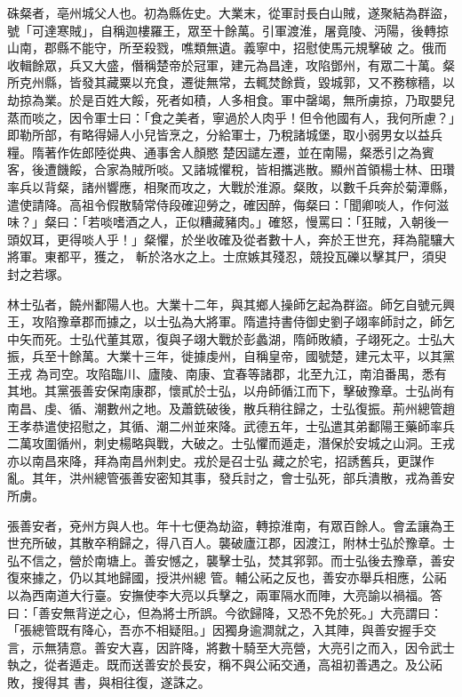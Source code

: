 \begin{pinyinscope}
 硃粲者，亳州城父人也。初為縣佐史。大業末，從軍討長白山賊，遂聚結為群盜，號「可達寒賊」，自稱迦樓羅王，眾至十餘萬。引軍渡淮，屠竟陵、沔陽，後轉掠山南，郡縣不能守，所至殺戮，噍類無遺。義寧中，招慰使馬元規擊破
 之。俄而收輯餘眾，兵又大盛，僭稱楚帝於冠軍，建元為昌達，攻陷鄧州，有眾二十萬。粲所克州縣，皆發其藏粟以充食，遷徙無常，去輒焚餘貲，毀城郭，又不務稼穡，以劫掠為業。於是百姓大餒，死者如積，人多相食。軍中罄竭，無所虜掠，乃取嬰兒蒸而啖之，因令軍士曰：「食之美者，寧過於人肉乎！但令他國有人，我何所慮？」即勒所部，有略得婦人小兒皆烹之，分給軍士，乃稅諸城堡，取小弱男女以益兵糧。隋著作佐郎陸從典、通事舍人顏愍
 楚因譴左遷，並在南陽，粲悉引之為賓客，後遭饑餒，合家為賊所啖。又諸城懼稅，皆相攜逃散。顯州首領楊士林、田瓚率兵以背粲，諸州響應，相聚而攻之，大戰於淮源。粲敗，以數千兵奔於菊潭縣，遣使請降。高祖令假散騎常侍段確迎勞之，確因醉，侮粲曰：「聞卿啖人，作何滋味？」粲曰：「若啖嗜酒之人，正似糟藏豬肉。」確怒，慢罵曰：「狂賊，入朝後一頭奴耳，更得啖人乎！」粲懼，於坐收確及從者數十人，奔於王世充，拜為龍驤大將軍。東都平，獲之，
 斬於洛水之上。士庶嫉其殘忍，競投瓦礫以擊其尸，須臾封之若塚。



 林士弘者，饒州鄱陽人也。大業十二年，與其鄉人操師乞起為群盜。師乞自號元興王，攻陷豫章郡而據之，以士弘為大將軍。隋遣持書侍御史劉子翊率師討之，師乞中矢而死。士弘代董其眾，復與子翊大戰於彭蠡湖，隋師敗績，子翊死之。士弘大振，兵至十餘萬。大業十三年，徙據虔州，自稱皇帝，國號楚，建元太平，以其黨王戎
 為司空。攻陷臨川、廬陵、南康、宜春等諸郡，北至九江，南洎番禺，悉有其地。其黨張善安保南康郡，懷貳於士弘，以舟師循江而下，擊破豫章。士弘尚有南昌、虔、循、潮數州之地。及蕭銑破後，散兵稍往歸之，士弘復振。荊州總管趙王孝恭遣使招慰之，其循、潮二州並來降。武德五年，士弘遣其弟鄱陽王藥師率兵二萬攻圍循州，刺史楊略與戰，大破之。士弘懼而遁走，潛保於安城之山洞。王戎亦以南昌來降，拜為南昌州刺史。戎於是召士弘
 藏之於宅，招誘舊兵，更謀作亂。其年，洪州總管張善安密知其事，發兵討之，會士弘死，部兵潰散，戎為善安所虜。



 張善安者，兗州方與人也。年十七便為劫盜，轉掠淮南，有眾百餘人。會孟讓為王世充所破，其散卒稍歸之，得八百人。襲破廬江郡，因渡江，附林士弘於豫章。士弘不信之，營於南塘上。善安憾之，襲擊士弘，焚其郛郭。而士弘後去豫章，善安復來據之，仍以其地歸國，授洪州總
 管。輔公祏之反也，善安亦舉兵相應，公祏以為西南道大行臺。安撫使李大亮以兵擊之，兩軍隔水而陣，大亮諭以禍福。答曰：「善安無背逆之心，但為將士所誤。今欲歸降，又恐不免於死。」大亮謂曰：「張總管既有降心，吾亦不相疑阻。」因獨身逾澗就之，入其陣，與善安握手交言，示無猜意。善安大喜，因許降，將數十騎至大亮營，大亮引之而入，因令武士執之，從者遁走。既而送善安於長安，稱不與公祏交通，高祖初善遇之。及公祏敗，搜得其
 書，與相往復，遂誅之。




\end{pinyinscope}
